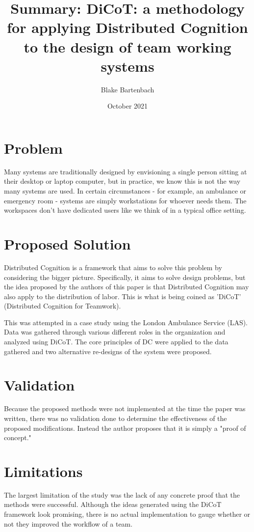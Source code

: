 \documentclass{article}
\title{Summary: DiCoT: a methodology for applying Distributed Cognition to the design of team working systems}
\author{Blake Bartenbach}
\date{October 2021}
\begin{document}
\maketitle

\section{Problem}
Many systems are traditionally designed by envisioning a single person sitting at their desktop or laptop computer, but in practice, we know this is not the way many systems are used. In certain circumstances - for example, an ambulance or emergency room - systems are simply workstations for whoever needs them. The workspaces don't have dedicated users like we think of in a typical office setting.

\section{Proposed Solution}
Distributed Cognition is a framework that aims to solve this problem by considering the bigger picture. Specifically, it aims to solve design problems, but the idea proposed by the authors of this paper is that Distributed Cognition may also apply to the distribution of labor. This is what is being coined as 'DiCoT' (Distributed Cognition for Teamwork).

This was attempted in a case study using the London Ambulance Service (LAS). Data was gathered through various different roles in the organization and analyzed using DiCoT. The core principles of DC were applied to the data gathered and two alternative re-designs of the system were proposed.

\section{Validation}
Because the proposed methods were not implemented at the time the paper was written, there was no validation done to determine the effectiveness of the proposed modifications. Instead the author proposes that it is simply a "proof of concept." 

\section{Limitations}
The largest limitation of the study was the lack of any concrete proof that the methods were successful. Although the ideas generated using the DiCoT framework look promising, there is no actual implementation to gauge whether or not they improved the workflow of a team.



\end{document}
